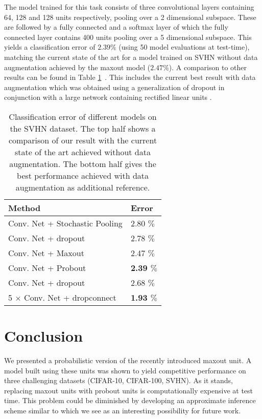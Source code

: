 \documentclass{article} \pdfoutput=1
\begin{document}
The model trained for this task consists of three convolutional layers
containing 64, 128 and 128 units respectively, pooling over a 2
dimensional subspace. These are followed by a fully connected and a
softmax layer of which the fully connected layer contains 400 units
pooling over a 5 dimensional subspace. 
This yields a classification
error of $2.39 \%$ (using 50 model evaluations at test-time), matching
the current state of the art for a model trained on SVHN without data
augmentation achieved by the maxout model ($2.47 \%$). A
comparison to other results can be found in Table
\ref{svhn_results}~. This includes the current best result 
with data augmentation which was obtained using a generalization of
dropout in conjunction with a large network containing rectified
linear units \cite{WanLi2013}.


\begin{table}[h]
\vspace{-0.1cm}
\caption{Classification error of different models on the
  SVHN dataset. The top half shows a comparison of our result with the
  current state of the art achieved without data
  augmentation. The bottom half gives the best performance achieved
  with data augmentation as additional reference.}
\begin{center}
\begin{small}
\begin{sc}
\begin{tabular}{l|l}
Method  & Error \\
\hline
Conv. Net + Stochastic Pooling \cite{ZeilerStochastic2013} & 2.80 $\%$ \\
Conv. Net + dropout \cite{Nitish2013Mas} & 2.78 $\%$ \\
Conv. Net + Maxout \cite{Goodfellow2013}  & 2.47 $\%$ \\
Conv. Net + Probout  & \textbf{2.39 $\%$} \\
\hline
Conv. Net + dropout \cite{Nitish2013Mas} & 2.68 $\%$  \\
5 $\times$ Conv. Net + dropconnect \cite{WanLi2013} & \textbf{1.93 $\%$}  \\
\hline
\end{tabular}
\end{sc}
\end{small}
\end{center}
\vskip -0.1in
\label{svhn_results}
\end{table}

\section{Conclusion}
We presented a probabilistic version of the recently introduced maxout
unit. A model built using these units was shown to yield competitive
performance on three challenging datasets (CIFAR-10, CIFAR-100,
SVHN). As it stands, replacing maxout units with probout units is
computationally expensive at test time. This problem could be
diminished by developing an approximate inference scheme similar to
\cite{Krizhevsky2012, Zeiler2013} which we see as an interesting
possibility for future work. 
\end{document}
